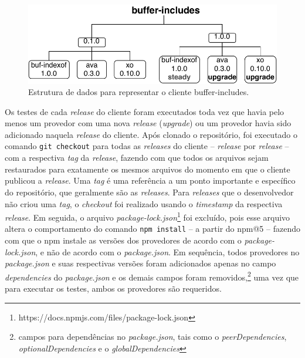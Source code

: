 \begin{figure}
    \centering
    \includegraphics[scale=0.9]{figuras/bcdetect_work.pdf}
    \caption{Estrutura de dados para representar o cliente \textsf{buffer-includes}.}
    \label{fig:bc_work}
\end{figure}{}

Os testes de cada \textit{release} do cliente foram executados toda vez que havia pelo menos um provedor com uma nova \textit{release} (\textit{upgrade}) ou um provedor havia sido adicionado naquela \textit{release} do cliente. Após clonado o repositório, foi executado o comando \texttt{git checkout} para todas as \textit{releases} do cliente -- \textit{release} por \textit{release} -- com a respectiva \textit{tag} da \textit{release}, fazendo com que todos os arquivos sejam restaurados para exatamente os mesmos arquivos do momento em que o cliente publicou a \textit{release}. Uma \textit{tag} é uma referência a um ponto importante e específico do repositório, que geralmente são as \textit{releases}. Para \textit{releases} que o desenvolvedor não criou uma \textit{tag}, o \textit{checkout} foi realizado usando o \textit{timestamp} da respectiva \textit{release}. Em seguida, o arquivo \textit{package-lock.json}\footnote{https://docs.npmjs.com/files/package-lock.json} foi excluído, pois esse arquivo altera o comportamento do comando \texttt{npm install} -- a partir do \textsf{npm@5} -- fazendo com que o \textsf{npm} instale as versões dos provedores de acordo com o \textit{package-lock.json}, e não de acordo com o \textit{package.json}. Em sequência, todos provedores no \textit{package.json} e suas respectivas versões foram adicionados apenas no campo \textit{dependencies} do \textit{package.json} e os demais campos foram removidos,\footnote{campos para dependências no \textit{package.json}, tais como o \textit{peerDependencies}, \textit{optionalDependencies} e o \textit{globalDependencies}} uma vez que para executar os testes, ambos os provedores são requeridos.

